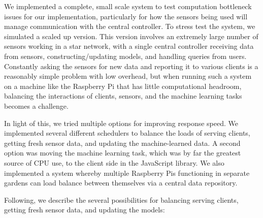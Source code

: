 \documentclass[a4paper]{acm_proc_article-sp}
\begin{document}
We implemented a complete, small scale system to test computation bottleneck issues for our implementation, particularly for how the sensors being used will manage communication with the central controller. To stress test the system, we simulated a scaled up version. This version involves an extremely large number of sensors working in a star network, with a single central controller receiving data from sensors, constructing/updating models, and handling queries from users.  Constantly asking the sensors for new data and reporting it to various clients is a reasonably simple problem with low overhead, but when running such a system on a machine like the Raspberry Pi that has little computational headroom, balancing the interactions of clients, sensors, and the machine learning tasks becomes a challenge.

In light of this, we tried multiple options for improving response speed.  We implemented several different schedulers to balance the loads of serving clients, getting fresh sensor data, and updating the machine-learned data.  A second option was moving the machine learning task, which was by far the greatest source of CPU use, to the client side in the JavaScript library.  We also implemented a system whereby multiple Raspberry Pis functioning in separate gardens can load balance between themselves via a central data repository.

Following, we describe the several possibilities for balancing serving clients, getting fresh sensor data, and updating the models:
\end{document}
